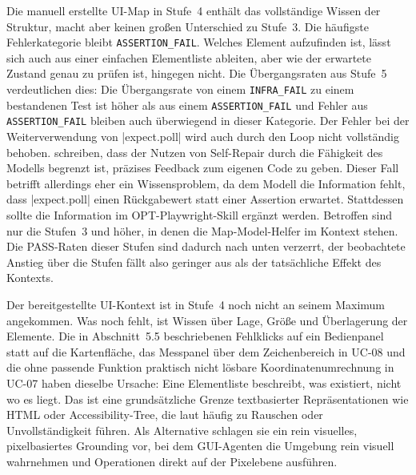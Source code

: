 Die manuell erstellte \ac{UI}-Map in Stufe~4 enthält das vollständige Wissen der Struktur, macht aber keinen großen Unterschied zu Stufe~3. Die häufigste Fehlerkategorie bleibt \texttt{ASSERTION\_FAIL}. Welches Element aufzufinden ist, lässt sich auch aus einer einfachen Elementliste ableiten, aber wie der erwartete Zustand genau zu prüfen ist, hingegen nicht. Die Übergangsraten aus Stufe~5 verdeutlichen dies: Die Übergangsrate von einem \texttt{INFRA\_FAIL} zu einem bestandenen Test ist höher als aus einem \texttt{ASSERTION\_FAIL} und Fehler aus \texttt{ASSERTION\_FAIL} bleiben auch überwiegend in dieser Kategorie. Der Fehler bei der Weiterverwendung von \code|expect.poll| wird auch durch den Loop nicht vollständig behoben. \textcite[S.~1]{olausson_is_2024} schreiben, dass der Nutzen von Self-Repair durch die Fähigkeit des Modells begrenzt ist, präzises Feedback zum eigenen Code zu geben. Dieser Fall betrifft allerdings eher ein Wissensproblem, da dem Modell die Information fehlt, dass \code|expect.poll| einen Rückgabewert statt einer Assertion erwartet. Stattdessen sollte die Information im \ac{OPT}-Playwright-Skill ergänzt werden. Betroffen sind nur die Stufen~3 und höher, in denen die Map-Model-Helfer im Kontext stehen. Die PASS-Raten dieser Stufen sind dadurch nach unten verzerrt, der beobachtete Anstieg über die Stufen fällt also geringer aus als der tatsächliche Effekt des Kontexts.

Der bereitgestellte \ac{UI}-Kontext ist in Stufe~4 noch nicht an seinem Maximum angekommen. Was noch fehlt, ist Wissen über Lage, Größe und Überlagerung der Elemente. Die in Abschnitt~5.5 beschriebenen Fehlklicks auf ein Bedienpanel statt auf die Kartenfläche, das Messpanel über dem Zeichenbereich in UC-08 und die ohne passende Funktion praktisch nicht lösbare Koordinatenumrechnung in UC-07 haben dieselbe Ursache: Eine Elementliste beschreibt, was existiert, nicht wo es liegt. Das ist eine grundsätzliche Grenze textbasierter Repräsentationen wie \ac{HTML} oder Accessibility-Tree, die laut \textcite[S.~1]{gou_navigating_2025} häufig zu Rauschen oder Unvollständigkeit führen. Als Alternative schlagen sie ein rein visuelles, pixelbasiertes Grounding vor, bei dem GUI-Agenten die Umgebung rein visuell wahrnehmen und Operationen direkt auf der Pixelebene ausführen.

